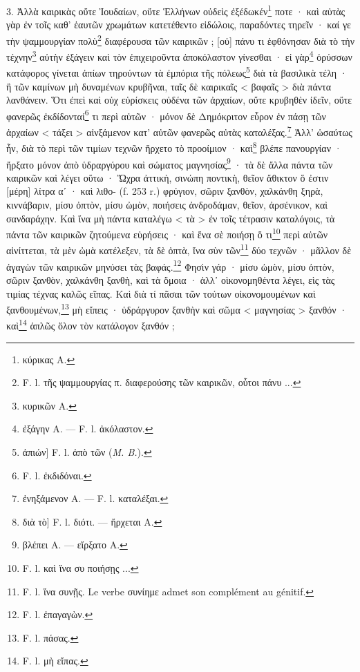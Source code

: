 \documentclass[landscape, a4paper, 11pt, oneside, polutonikogreek, french]{article}
\begin{document}
3. Ἀλλὰ καιρικὰς οὔτε Ἰουδαίων, οὔτε Ἑλλήνων οὐδεὶς ἐξέδωκέν\footnote{κύρικας A.} ποτε · καὶ αὐτὰς γὰρ ἐν τοῖς καθ' ἑαυτῶν χρωμάτων κατετέθεντο εἰδώλοις, παραδόντες τηρεῖν · καί γε τὴν ψαμμουργίαν πολὺ\footnote{F. l. τῆς ψαμμουργίας π. διαφερούσης τῶν καιρικῶν, οὗτοι πάνυ ...} διαφέρουσα τῶν καιρικῶν ; [οὐ] πάνυ τι ἐφθόνησαν διὰ τὸ τὴν τέχνην\footnote{κυρικῶν A.} αὐτὴν ἐξάγειν καὶ τὸν ἐπιχειροῦντα ἀποκόλαστον γίνεσθαι · εἰ γὰρ\footnote{ἐξάγην A. --- F. l. ἀκόλαστον.} ὀρύσσων κατάφορος γίνεται ἀπίων τηρούντων τὰ ἐμπόρια τῆς πόλεως\footnote{ἀπιών] F. l. ἀπὸ τῶν (\emph{M. B.}).} διὰ τὰ βασιλικὰ τέλη · ἢ τῶν καμίνων μὴ δυναμένων κρυβῆναι, ταῖς δὲ καιρικαῖς < βαφαῖς > διὰ πάντα λανθάνειν. Ὅτι ἐπεὶ καὶ οὐχ εὑρίσκεις οὐδένα τῶν ἀρχαίων, οὔτε κρυβηθὲν ἰδεῖν, οὔτε φανερῶς ἐκδίδονταί\footnote{F. l. ἐκδιδόναι.} τι περὶ αὐτῶν · μόνον δὲ Δημόκριτον εὗρον ἐν πάσῃ τῶν ἀρχαίων < τάξει > αἰνξάμενον κατ' αὐτῶν φανερῶς αὐτὰς καταλέξας.\footnote{ἐνηξάμενον A. --- F. l. καταλέξαι.} Ἀλλ' ὡσαύτως ἦν, διὰ τὸ περὶ τῶν τιμίων τεχνῶν ἤρχετο τὸ προοίμιον · καὶ\footnote{διὰ τὸ] F. l. διότι. --- ἤρχεται A.} βλέπε πανουργίαν · ἤρξατο μόνον ἀπὸ ὑδραργύρου καὶ σώματος μαγνησίας\footnote{βλέπει A. --- εἴρξατο A.} · τὰ δὲ ἄλλα πάντα τῶν καιρικῶν καὶ λέγει οὕτω · Ὤχρα ἀττικὴ, σινώπη ποντικὴ, θεῖον ἄθικτον ὅ ἐστιν [μέρη] λίτρα αʹ · καὶ λιθο- (f. 253 r.) φρύγιον, σῶριν ξανθὸν, χαλκάνθη ξηρὰ, κιννάβαριν, μίσυ ὀπτὸν, μίσυ ὠμὸν, ποιήσεις ἀνδροδάμαν, θεῖον, ἀρσένικον, καὶ σανδαράχην. Καὶ ἵνα μὴ πάντα καταλέγω < τὰ > ἐν τοῖς τέτρασιν καταλόγοις, τὰ πάντα τῶν καιρικῶν ζητούμενα εὑρήσεις · καὶ ἕνα σὲ ποιήσῃ ὅ τι\footnote{F. l. καὶ ἵνα συ ποιήσῃς ...} περὶ αὐτῶν αἰνίττεται, τὰ μὲν ὠμὰ κατέλεξεν, τὰ δὲ ὀπτὰ, ἵνα σὺν τῶν\footnote{F. l. ἵνα συνῇς. Le verbe συνίημε admet son complément au génitif.} δύο τεχνῶν · μᾶλλον δὲ ἀγαγὼν τῶν καιρικῶν μηνύσει τὰς βαφάς.\footnote{F. l. ἐπαγαγὼν.} Φησὶν γάρ · μίσυ ὠμὸν, μίσυ ὀπτὸν, σῶριν ξανθὸν, χαλκάνθη ξανθὴ, καὶ τὰ ὄμοια · ἀλλ᾽ οὶκονομηθέντα λέγει, εὶς τὰς τιμίας τέχνας καλῶς εῖπας. Καὶ διὰ τί πᾶσαι τῶν τούτων οἰκονομουμένων καὶ ξανθουμένων,\footnote{F. l. πάσας.} μὴ εἴπεις · ὑδράργυρον ξανθὴν καὶ σῶμα < μαγνησίας > ξανθόν · καὶ\footnote{F. l. μὴ εἴπας.} ἁπλῶς ὅλον τὸν κατάλογον ξανθόν ;
\end{document}
